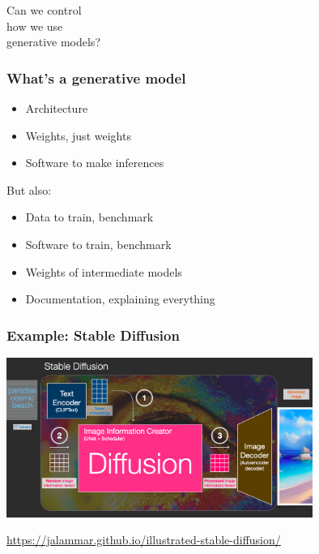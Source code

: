 \documentclass[17pt,aspectratio=169,hyperref={pdfusetitle,colorlinks,allcolors=olive}]{beamer}
\begin{document}
\begin{frame}[fragile]

  {\Large
    Can we control \\
    how we use \\
    generative models? \\
  }  
\end{frame}

\begin{frame}[fragile]
  \frametitle{What's a generative model}

  \begin{itemize}
  \item Architecture
  \item Weights, just weights
  \item Software to make inferences
  \end{itemize}

  But also:

  \begin{itemize}
  \item Data to train, benchmark
  \item Software to train, benchmark
  \item Weights of intermediate models
  \item Documentation, explaining everything
  \end{itemize}
\end{frame}



\begin{frame}[fragile]
  \frametitle{Example: Stable Diffusion}

      \includegraphics[width=10cm]{figs/sd-process}

  \begin{flushright}
    {\scriptsize
    \url{https://jalammar.github.io/illustrated-stable-diffusion/}
    }
  \end{flushright}

\end{frame}
\end{document}
